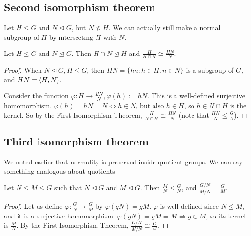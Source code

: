 \subsection{Second isomorphism theorem}
Let \(H\leq G\) and \(N\trianglelefteq G\), but \(N \nleq H\).
We can actually still make a normal subgroup of \(H\) by intersecting \(H\) with \(N\).
\begin{theorem}
	Let \(H \leq G\) and \(N \trianglelefteq G\).
	Then \(H \cap N \trianglelefteq H\) and \(\frac{H}{H \cap N} \cong \frac{HN}{N}\).
\end{theorem}
\begin{proof}
	When \(N \trianglelefteq G, H \leq G\), then \(HN = \{ hn: h \in H, n \in N \}\) is a subgroup of \(G\), and \(HN = \langle{} H, N \rangle\).

	Consider the function \(\varphi: H \to \frac{HN}{N}, \varphi(h) := hN\).
	This is a well-defined surjective homomorphism.
	\(\varphi(h) = hN = N \iff h \in N\), but also \(h \in H\), so \(h \in N \cap H\) is the kernel.
	So by the First Isomorphism Theorem, \(\frac{H}{N \cap H} \cong \frac{HN}{N}\) (note that \(\frac{HN}{N} \leq \frac{G}{N}\)).
\end{proof}

\subsection{Third isomorphism theorem}
We noted earlier that normality is preserved inside quotient groups.
We can say something analogous about quotients.
\begin{theorem}
	Let \(N \leq M \leq G\) such that \(N \trianglelefteq G\) and \(M \trianglelefteq G\).
	Then \(\frac{M}{N} \trianglelefteq \frac{G}{N}\), and \(\frac{G/N}{M/N} = \frac{G}{M}\).
\end{theorem}
\begin{proof}
	Let us define \(\varphi: \frac{G}{N} \to \frac{G}{M}\) by \(\varphi(gN) = gM\).
	\(\varphi\) is well defined since \(N \leq M\), and it is a surjective homomorphism.
	\(\varphi(gN) = gM = M \iff g \in M\), so its kernel is \(\frac{M}{N}\).
	By the First Isomorphism Theorem, \(\frac{G/N}{M/N} \cong \frac{G}{M}\).
\end{proof}

